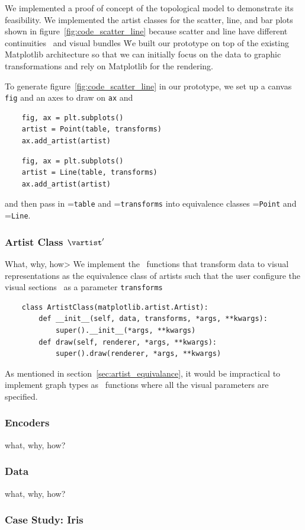 \documentclass[../main.tex]{subfiles}
\begin{document}
We implemented a proof of concept of the topological model to demonstrate its feasibility. We implemented the artist classes for the scatter, line, and bar plots shown in figure~\ref{fig:code_scatter_line} because scatter and line have different continuities \gbase\ and visual bundles \vtotal\. We built our prototype on top of the existing Matplotlib architecture \cite{hunterMatplotlib2DGraphics2007,hunterArchitectureOpenSource} so that we can initially focus on the data to graphic transformations and rely on Matplotlib for the rendering. 

To generate figure~\ref{fig:code_scatter_line} in our prototype, we set up a canvas \texttt{fig} and an axes to draw on \texttt{ax} and 
\begin{multicols*}{2}
\begin{verbatim}
    fig, ax = plt.subplots()
    artist = Point(table, transforms)
    ax.add_artist(artist)
\end{verbatim}
\columnbreak
\begin{verbatim}
    fig, ax = plt.subplots()
    artist = Line(table, transforms)
    ax.add_artist(artist)
\end{verbatim}
\end{multicols*}
 and then pass in \dsection=\texttt{table} and \vchannel=\texttt{transforms} into equivalence classes \vartisteq=\texttt{Point} and  \vartisteq=\texttt{Line}.  

\subsubsection{Artist Class $\vartist^{\prime}$}
What, why, how>
We implement the \vartist\ functions that transform data to visual representations as the equivalence class of artists such that the user configure the visual sections \vsection\ as a parameter \texttt{transforms}

\begin{verbatim}
    class ArtistClass(matplotlib.artist.Artist):
        def __init__(self, data, transforms, *args, **kwargs):
            super().__init__(*args, **kwargs)
        def draw(self, renderer, *args, **kwargs):
            super().draw(renderer, *args, **kwargs)
\end{verbatim}





As mentioned in section~\ref{sec:artist_equivalance}, it would be impractical to implement graph types as \vartist\ functions where all the visual parameters are specified.  

\subsubsection{Encoders \vchannel}
what, why, how?
\subsubsection{Data \dtotal}
what, why, how?

\subsubsection{Case Study: Iris}
\end{document}

